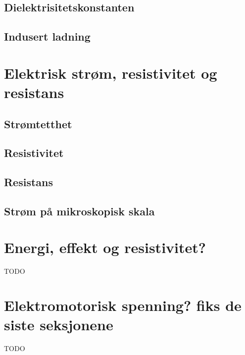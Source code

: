 \documentclass{article}
\begin{document}
    \subsection{Dielektrisitetskonstanten}
      
    \subsection{Indusert ladning}
      
  \section{Elektrisk strøm, resistivitet og resistans}
    \subsection{Strømtetthet}
      
    \subsection{Resistivitet}
      
    \subsection{Resistans}
      
    \subsection{Strøm på mikroskopisk skala}
      
  \section{Energi, effekt og resistivitet?}
    TODO
  \section{Elektromotorisk spenning? fiks de siste seksjonene}
    TODO
\end{document}
